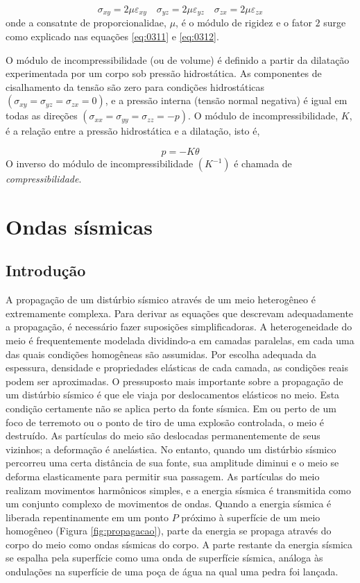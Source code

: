 \documentclass[]{book}
\theoremstyle{definition}
\theoremstyle{definition}
\theoremstyle{definition}
\theoremstyle{remark}
\begin{document}
\[
\sigma_{x y}=2 \mu \varepsilon_{x y} \quad \sigma_{y z}=2 \mu \varepsilon_{y z} \quad \sigma_{z x}=2 \mu \varepsilon_{z x}
\]
onde a consatnte de proporcionalidae, \(\mu\), é o módulo de rigidez e o fator \(2\) surge como explicado nas equações \eqref{eq:0311} e \eqref{eq:0312}.

O módulo de incompressibilidade (ou de volume) é definido a partir da dilatação experimentada por um corpo sob pressão hidrostática. As componentes de cisalhamento da tensão são zero para condições hidrostáticas \((\sigma_{xy}=\sigma_{yz}=\sigma_{zx}=0)\), e a pressão interna (tensão normal negativa) é igual em todas as direções \((\sigma_{xx}=\sigma_{yy}=\sigma_{zz}= -p)\). O módulo de incompressibilidade, \(K\), é a relação entre a pressão hidrostática e a dilatação, isto é,

\[
p=-K \theta
\]
O inverso do módulo de incompressibilidade \((K^{-1})\) é chamada de \emph{compressibilidade}.

\hypertarget{ondas-sismicas}{%
\section{Ondas sísmicas}\label{ondas-sismicas}}

\hypertarget{introducao-2}{%
\subsection{Introdução}\label{introducao-2}}

A propagação de um distúrbio sísmico através de um meio heterogêneo é extremamente complexa. Para derivar as equações que descrevam adequadamente a propagação, é necessário fazer suposições simplificadoras. A heterogeneidade do meio é frequentemente modelada dividindo-a em camadas paralelas, em cada uma das quais condições homogêneas são assumidas. Por escolha adequada da espessura, densidade e propriedades elásticas de cada camada, as condições reais podem ser aproximadas. O pressuposto mais importante sobre a propagação de um distúrbio sísmico é que ele viaja por deslocamentos elásticos no meio. Esta condição certamente não se aplica perto da fonte sísmica. Em ou perto de um foco de terremoto ou o ponto de tiro de uma explosão controlada, o meio é destruído. As partículas do meio são deslocadas permanentemente de seus vizinhos; a deformação é anelástica. No entanto, quando um distúrbio sísmico percorreu uma certa distância de sua fonte, sua amplitude diminui e o meio se deforma elasticamente para permitir sua passagem. As partículas do meio realizam movimentos harmônicos simples, e a energia sísmica é transmitida como um conjunto complexo de movimentos de ondas. Quando a energia sísmica é liberada repentinamente em um ponto \({P}\) próximo à superfície de um meio homogêneo (Figura \ref{fig:propagacao}), parte da energia se propaga através do corpo do meio como ondas sísmicas do corpo. A parte restante da energia sísmica se espalha pela superfície como uma onda de superfície sísmica, análoga às ondulações na superfície de uma poça de água na qual uma pedra foi lançada.
\end{document}
